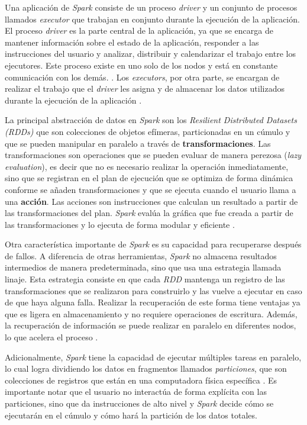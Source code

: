 Una aplicación de \textit{Spark} consiste de un proceso \textit{driver} y un conjunto de procesos llamados \textit{executor} que trabajan en conjunto durante la ejecución de la aplicación. El proceso \textit{driver} es la parte central de la aplicación, ya que se encarga de mantener información sobre el estado de la aplicación, responder a las instrucciones del usuario y analizar, distribuir y calendarizar el trabajo entre los ejecutores. Este proceso existe en uno solo de los nodos y está en constante comunicación con los demás. \cite{sparkguide}. Los \textit{executors}, por otra parte, se encargan de realizar el trabajo que el \textit{driver} les asigna y de almacenar los datos utilizados durante la ejecución de la aplicación \cite{sparkclusteroverview}.

La principal abstracción de datos en \textit{Spark} son los \textit{Resilient Distributed Datasets (RDDs)} que son colecciones de objetos efímeras, particionadas en un cúmulo y que se pueden manipular en paralelo a través de \textbf{transformaciones}. Las transformaciones son operaciones que se pueden evaluar de manera perezosa (\textit{lazy evaluation}), es decir que no es necesario realizar la operación inmediatamente, sino que se registran en el plan de ejecución que se optimiza de forma dinámica conforme se añaden transformaciones y que se ejecuta cuando el usuario llama a una \textbf{acción}. Las acciones son instrucciones que calculan un resultado a partir de las transformaciones del plan. \textit{Spark} evalúa la gráfica que fue creada a partir de las transformaciones y lo ejecuta de forma modular y eficiente \cite{sparkberkeley}.

Otra característica importante de \textit{Spark} es su capacidad para recuperarse después de fallos. A diferencia de otras herramientas, \textit{Spark} no almacena resultados intermedios de manera predeterminada, sino que usa una estrategia llamada linaje. Esta estrategia consiste en que cada \textit{RDD} mantenga un registro de las transformaciones que se realizaron para construirlo y las vuelve a ejecutar en caso de que haya alguna falla. Realizar la recuperación de este forma tiene ventajas ya que es ligera en almacenamiento y no requiere operaciones de escritura. Además, la recuperación de información se puede realizar en paralelo en diferentes nodos, lo que acelera el proceso \cite{sparkberkeley}.

Adicionalmente, \textit{Spark} tiene la capacidad de ejecutar múltiples tareas en paralelo, lo cual logra dividiendo los datos en fragmentos llamados \textit{particiones}, que son colecciones de registros que están en una computadora física específica \cite{sparkguide}. Es importante notar que el usuario no interactúa de forma explícita con las particiones, sino que da instrucciones de alto nivel y \textit{Spark} decide cómo se ejecutarán en el cúmulo y cómo hará la partición de los datos totales.

